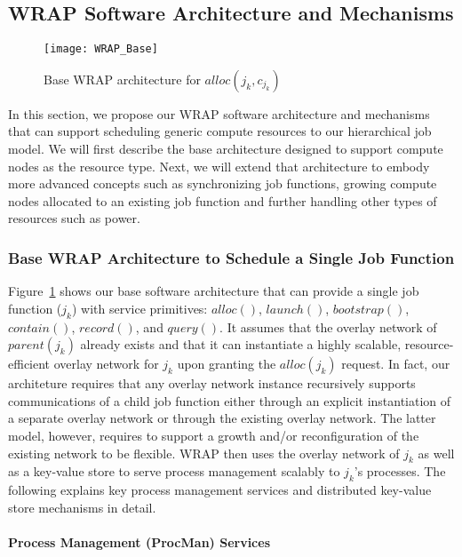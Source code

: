 \subsection{WRAP Software Architecture and Mechanisms}
\label{sect:arch}
\begin{figure}
  \centering
    \texttt{[image: WRAP\_Base]}
  \caption{Base WRAP architecture for $alloc(j_k, c_{j_k})$}
  \label{fig:base}
\end{figure}
In this section, we propose our WRAP software architecture and mechanisms
that can support scheduling generic compute resources to our hierarchical job
model. We will first describe the base architecture designed to support
compute nodes as the resource type. Next, we will extend that architecture
to embody more advanced concepts such as synchronizing job functions,
growing compute nodes allocated to an existing job function and further
handling other types of resources such as power.

\subsubsection{Base WRAP Architecture to Schedule a Single Job Function}
Figure~\ref{fig:base} shows our base software architecture
that can provide a single job function ($j_k$) with service primitives:
$alloc()$,
$launch()$,
$bootstrap()$,
$contain()$,
$record()$, and
$query()$.
It assumes that the overlay network of $parent(j_k)$
already exists and that it can instantiate a highly scalable,
resource-efficient overlay network for $j_k$ upon
granting the $alloc(j_k)$ request. In fact, our architeture
requires that any overlay network instance recursively
supports communications of a child job function either
through an explicit instantiation of a separate overlay network
or through the existing overlay network. The latter model,
however, requires to support a growth and/or reconfiguration
of the existing network to be flexible.
WRAP then uses the overlay network of $j_k$ as well as
a key-value store to serve process management scalably
to $j_k$'s processes.
The following explains key process management services
and distributed key-value store mechanisms in detail.

\paragraph{Process Management (ProcMan) Services}
\label{sect:procman}

